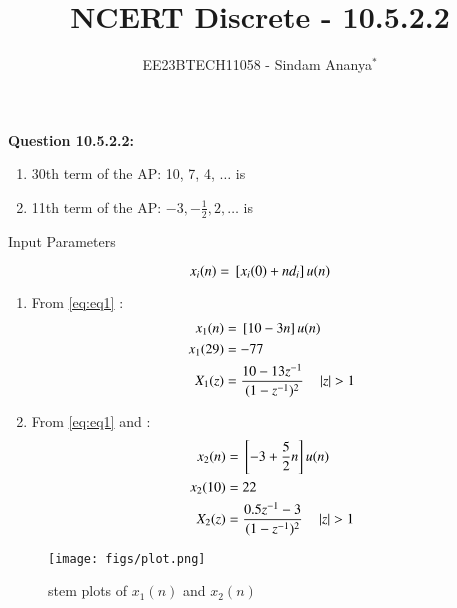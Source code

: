 \documentclass[journal,12pt,twocolumn]{IEEEtran}
\theoremstyle{remark}
\begin{document}

\vspace{3cm}

\title{NCERT Discrete - 10.5.2.2}
\author{EE23BTECH11058 - Sindam Ananya$^{*}$%
}
\maketitle
\newpage
\bigskip

\renewcommand{\thefigure}{\theenumi}
\renewcommand{\thetable}{\theenumi}

\vspace{3cm}
\textbf{Question 10.5.2.2:} 
\begin{enumerate}
\item 30th term of the AP: 10, 7, 4, $\ldots$ is 
\item 11th term of the AP: $-3, -\frac{1}{2}, 2, \ldots$ is
\end{enumerate}
\solution
\begin{table}[h!]
    \centering
    
    \caption{Input Parameters}
    \label{tab:table1}
    \end{table}
\begin{equation}
    x_i(n) = {}\left[x_i(0) + nd_i\right] u(n)
    \label{eq:eq1}
\end{equation}
\begin{enumerate}
\item From \eqref{eq:eq1}  :
\begin{align}
x_1(n) &= {}\left[10 -3n\right]u(n)\\
x_1(29) &= -77\\
X_1(z) &= \frac{10 - 13z^{-1}}{(1-z^{-1})^2} \quad \left\vert z\right\vert > 1
\end{align}
\item From \eqref{eq:eq1} and  :
\begin{align}
x_2(n) &= {}\left[-3 + \frac{5}{2}n\right]u(n)\\
x_2(10) &= 22\\
X_2(z) &= \frac{0.5z^{-1}-3}{(1-z^{-1})^2} \quad \left\vert z\right\vert> 1
\end{align}
\end{enumerate}
\begin{figure}[h!]
    \centering
    \texttt{[image: figs/plot.png]}
    \caption{stem plots of $x_1(n)$ and $x_2(n)$}
    \label{fig:1}
\end{figure}
\end{document}
